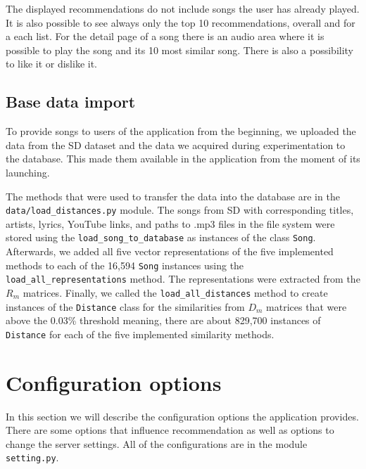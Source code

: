 The displayed recommendations do not include songs the user has already played. It is also possible to see always only the top 10 recommendations, overall and for a each list. For the detail page of a song there is an audio area where it is possible to play the song and its 10 most similar song. There is also a possibility to like it or dislike it.  

\subsection{Base data import}

To provide songs to users of the application from the beginning, we uploaded the data from the SD dataset and the data we acquired during experimentation to the database. This made them available in the application from the moment of its launching. 

The methods that were used to transfer the data into the database are in the \texttt{data/load\_distances.py} module. The songs from SD with corresponding titles, artists, lyrics, YouTube links, and paths to .mp3 files in the file system were stored using the \texttt{load\_song\_to\_database} as instances of the class \texttt{Song}. Afterwards, we added all five vector representations of the five implemented methods to each of the 16,594 \texttt{Song} instances using the \texttt{load\_all\_representations} method. The representations were extracted from the $R_m$ matrices. Finally, we called the \texttt{load\_all\_distances} method to create instances of the \texttt{Distance} class for the similarities from $D_m$ matrices that were above the 0.03\% threshold meaning, there are about 829,700 instances of \texttt{Distance} for each of the five implemented similarity methods.

\section{Configuration options}\label{sec:configurations}

In this section we will describe the configuration options the application provides. There are some options that influence recommendation as well as options to change the server settings. All of the configurations are in the module \texttt{setting.py}.

